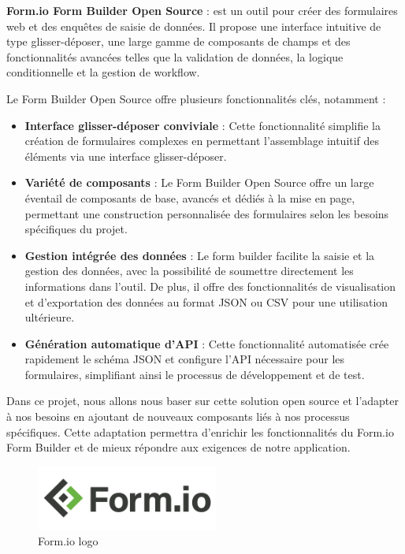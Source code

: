 \textbf{Form.io Form Builder Open Source} : est un outil pour créer des formulaires web et des enquêtes de saisie de données. Il propose une interface intuitive de type glisser-déposer, une large gamme de composants de champs et des fonctionnalités avancées telles que la validation de données, la logique conditionnelle et la gestion de workflow.

Le Form Builder Open Source offre plusieurs fonctionnalités clés, notamment :

\begin{itemize}
    \item \textbf{Interface glisser-déposer conviviale} : Cette fonctionnalité simplifie la création de formulaires complexes en permettant l'assemblage intuitif des éléments via une interface glisser-déposer.

    \item \textbf{Variété de composants} : Le Form Builder Open Source offre un large éventail de composants de base, avancés et dédiés à la mise en page, permettant une construction personnalisée des formulaires selon les besoins spécifiques du projet. 

    \item \textbf{Gestion intégrée des données} : Le form builder facilite la saisie et la gestion des données, avec la possibilité de soumettre directement les informations dans l'outil. De plus, il offre des fonctionnalités de visualisation et d'exportation des données au format JSON ou CSV pour une utilisation ultérieure.

    \item \textbf{Génération automatique d'API} : Cette fonctionnalité automatisée crée rapidement le schéma JSON et configure l'API nécessaire pour les formulaires, simplifiant ainsi le processus de développement et de test.
\end{itemize}

Dans ce projet, nous allons nous baser sur cette solution open source et l'adapter à nos besoins en ajoutant de nouveaux composants liés à nos processus spécifiques. Cette adaptation permettra d'enrichir les fonctionnalités du Form.io Form Builder et de mieux répondre aux exigences de notre application.
\\
\begin{figure}[H] 
    \centering
    \includegraphics[width=6cm]{Figures/dormiologo.png}
        \caption{Form.io logo}
\end{figure}




